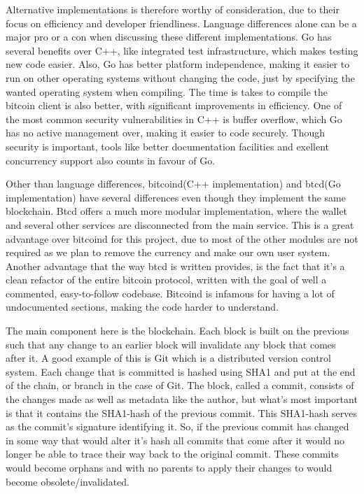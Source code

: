 \documentclass[12pt]{article}
\begin{document}
Alternative implementations is therefore worthy of consideration, due to their focus on efficiency and developer friendliness. Language differences alone can be a major pro or a con when discussing these different implementations. Go has several benefits over C++, like integrated test infrastructure, which makes testing new code easier. Also, Go has better platform independence, making it easier to run on other operating systems without changing the code, just by specifying the wanted operating system when compiling. The time is takes to compile the bitcoin client is also better, with significant improvements in efficiency. One of the most common security vulnerabilities in C++ is buffer overflow, which Go has no active management over, making it easier to code securely. Though security is important, tools like better documentation facilities and exellent concurrency support also counts in favour of Go. 

Other than language differences, bitcoind(C++ implementation) and btcd(Go implementation)
have several differences even though they implement the same blockchain. Btcd offers a much more modular implementation, where the wallet and several other services are disconnected from the main service. This is a great advantage over bitcoind for this project, due to most of the other modules are not required as we plan to remove the currency and make our own user system. Another advantage that the way btcd is written provides, is the fact that it's a clean refactor of the entire bitcoin protocol, written with the goal of well a commented, easy-to-follow codebase. Bitcoind is infamous for having a lot of undocumented sections, making the code harder to understand. 

The main component here is the blockchain. Each block is built on the previous such that any change to an earlier block will invalidate any block that comes after it. A good example of this is Git which is a distributed version control system. Each change that is committed is hashed using SHA1 and put at the end of the chain, or branch in the case of Git. The block, called a commit, consists of the changes made as well as metadata like the author, but what's most important is that it contains the SHA1-hash of the previous commit. This SHA1-hash serves as the commit's signature identifying it. So, if the previous commit has changed in some way that would alter it's hash all commits that come after it would no longer be able to trace their way back to the original commit. These commits would become orphans and with no parents to apply their changes to would become obsolete/invalidated.
\end{document}
